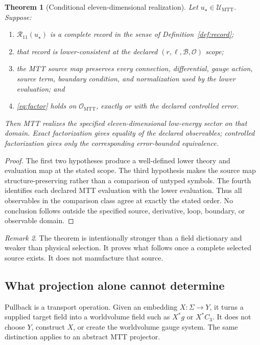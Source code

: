 \documentclass[11pt]{article}
\newtheorem{theorem}{Theorem}[section]
\theoremstyle{definition}
\theoremstyle{remark}
\newtheorem{remark}[theorem]{Remark}
\newcommand{\cB}{\mathcal B}
\newcommand{\cO}{\mathcal O}
\newcommand{\cR}{\mathcal R}
\newcommand{\cU}{\mathcal U}
\begin{document}
\begin{theorem}[Conditional eleven-dimensional realization]
\label{thm:realization}
Let \(u_\star\in\cU_{\mathrm{MTT}}\).  Suppose:
\begin{enumerate}[leftmargin=1.7em]
\item \(\cR_{11}(u_\star)\) is a complete record in the sense of
      Definition~\ref{def:record};
\item that record is lower-consistent at the declared
      \((r,\ell,\cB,\cO)\) scope;
\item the MTT source map preserves every connection, differential,
      gauge action, source term, boundary condition, and normalization used
      by the lower evaluation; and
\item \cref{eq:factor} holds on \(\cO_{\mathrm{MTT}}\), exactly or with the
      declared controlled error.
\end{enumerate}
Then MTT realizes the specified eleven-dimensional low-energy sector on that
domain.  Exact factorization gives equality of the declared observables;
controlled factorization gives only the corresponding error-bounded
equivalence.
\end{theorem}

\begin{proof}
The first two hypotheses produce a well-defined lower theory and evaluation
map at the stated scope.  The third hypothesis makes the source map
structure-preserving rather than a comparison of untyped symbols.  The
fourth identifies each declared MTT evaluation with the lower evaluation.
Thus all observables in the comparison class agree at exactly the stated
order.  No conclusion follows outside the specified source, derivative,
loop, boundary, or observable domain.
\end{proof}

\begin{remark}
The theorem is intentionally stronger than a field dictionary and weaker
than physical selection.  It proves what follows once a complete selected
source exists.  It does not manufacture that source.
\end{remark}

\subsection{What projection alone cannot determine}

Pullback is a transport operation.  Given an embedding
\(X:\Sigma\to Y\), it turns a supplied target field into a worldvolume field
such as \(X^\ast g\) or \(X^\ast C_3\).  It does not choose \(Y\), construct
\(X\), or create the worldvolume gauge system.  The same distinction applies
to an abstract MTT projector.
\end{document}

